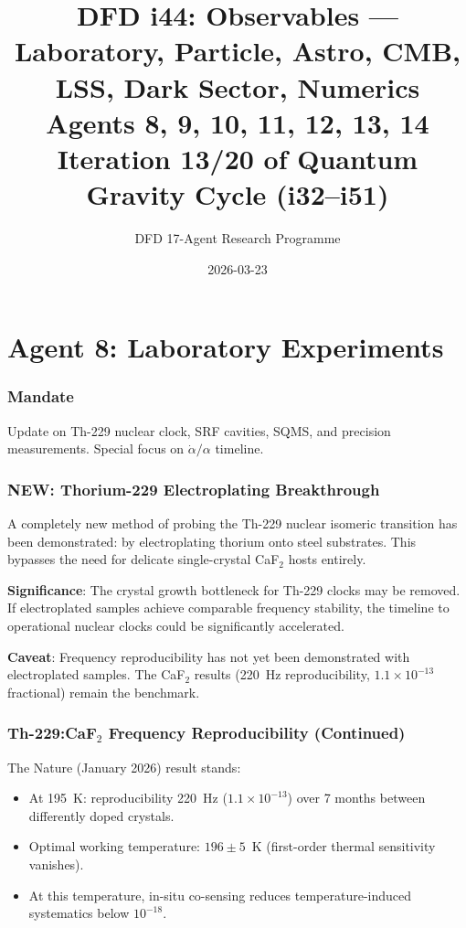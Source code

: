 \documentclass[11pt,a4paper]{article}
\title{DFD i44: Observables --- Laboratory, Particle, Astro, CMB, LSS, Dark Sector, Numerics\\[6pt]
\large Agents 8, 9, 10, 11, 12, 13, 14\\[6pt]
\normalsize Iteration 13/20 of Quantum Gravity Cycle (i32--i51)}
\author{DFD 17-Agent Research Programme}
\date{2026-03-23}
\newcommand{\NEW}{\textcolor{dfdblue}{\textbf{NEW}}}
\begin{document}
\maketitle
\tableofcontents
\newpage

\part{Agent 8: Laboratory Experiments}
\label{part:agent8}

\section{Mandate}

Update on Th-229 nuclear clock, SRF cavities, SQMS, and precision measurements. Special focus on $\dot{\alpha}/\alpha$ timeline.

\section{\NEW: Thorium-229 Electroplating Breakthrough}

\begin{tcolorbox}[colback=blue!5!white, colframe=blue!60!black,
  title={Electroplated Th-229 on Steel (ScienceDaily, January 2026)}]
A completely new method of probing the Th-229 nuclear isomeric transition has been demonstrated: by electroplating thorium onto steel substrates. This bypasses the need for delicate single-crystal CaF$_2$ hosts entirely.

\textbf{Significance}: The crystal growth bottleneck for Th-229 clocks may be removed. If electroplated samples achieve comparable frequency stability, the timeline to operational nuclear clocks could be significantly accelerated.

\textbf{Caveat}: Frequency reproducibility has not yet been demonstrated with electroplated samples. The CaF$_2$ results (220~Hz reproducibility, $1.1 \times 10^{-13}$ fractional) remain the benchmark.
\end{tcolorbox}

\section{Th-229:CaF$_2$ Frequency Reproducibility (Continued)}

The Nature (January 2026) result stands:
\begin{itemize}
\item At 195~K: reproducibility 220~Hz ($1.1 \times 10^{-13}$) over 7 months between differently doped crystals.
\item Optimal working temperature: $196 \pm 5$~K (first-order thermal sensitivity vanishes).
\item At this temperature, in-situ co-sensing reduces temperature-induced systematics below $10^{-18}$.
\end{itemize}
\end{document}
